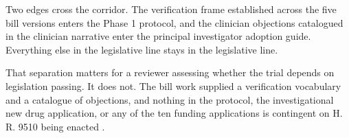 Two edges cross the corridor. The verification frame established across the five
bill versions enters the Phase 1 protocol, and the clinician objections
catalogued in the clinician narrative enter the principal investigator adoption
guide. Everything else in the legislative line stays in the legislative line.

That separation matters for a reviewer assessing whether the trial depends on
legislation passing. It does not. The bill work supplied a verification
vocabulary and a catalogue of objections, and nothing in the protocol, the
investigational new drug application, or any of the ten funding applications is
contingent on H. R. 9510 being enacted \cite{hr9510billv5,clintrust}.
